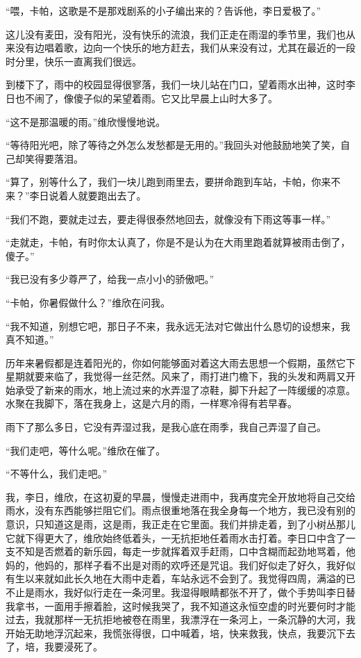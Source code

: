 \par “喂，卡帕，这歌是不是那戏剧系的小子编出来的？告诉他，李日爱极了。”
\par 这儿没有麦田，没有阳光，没有快乐的流浪，我们正走在雨湿的季节里，我们也从来没有边唱着歌，边向一个快乐的地方赶去，我们从来没有过，尤其在最近的一段时分里，快乐一直离我们很远。
\par 到楼下了，雨中的校园显得很寥落，我们一块儿站在门口，望着雨水出神，这时李日也不闹了，像傻子似的呆望着雨。它又比早晨上山时大多了。
\par “这不是那温暖的雨。”维欣慢慢地说。
\par “等待阳光吧，除了等待之外怎么发愁都是无用的。”我回头对他鼓励地笑了笑，自己却笑得要落泪。
\par “算了，别等什么了，我们一块儿跑到雨里去，要拼命跑到车站，卡帕，你来不来？”李日说着人就要跑出去了。
\par “我们不跑，要就走过去，要走得很泰然地回去，就像没有下雨这等事一样。”
\par “走就走，卡帕，有时你太认真了，你是不是认为在大雨里跑着就算被雨击倒了，傻子。”
\par “我已没有多少尊严了，给我一点小小的骄傲吧。”
\par “卡帕，你暑假做什么？”维欣在问我。
\par “我不知道，别想它吧，那日子不来，我永远无法对它做出什么恳切的设想来，我真不知道。”
\par 历年来暑假都是连着阳光的，你如何能够面对着这大雨去思想一个假期，虽然它下星期就要来临了，我觉得一丝茫然。风来了，雨打进门檐下，我的头发和两肩又开始承受了新来的雨水，地上流过来的水弄湿了凉鞋，脚下升起了一阵缓缓的凉意。水聚在我脚下，落在我身上，这是六月的雨，一样寒冷得有若早春。
\par 雨下了那么多日，它没有弄湿过我，是我心底在雨季，我自己弄湿了自己。
\par “我们走吧，等什么呢。”维欣在催了。
\par “不等什么，我们走吧。”
\par 我，李日，维欣，在这初夏的早晨，慢慢走进雨中，我再度完全开放地将自己交给雨水，没有东西能够拦阻它们。雨点很重地落在我全身每一个地方，我已没有别的意识，只知道这是雨，这是雨，我正走在它里面。我们并排走着，到了小树丛那儿它就下得更大了，维欣始终低着头，一无抗拒地任着雨水击打着。李日口中含了一支不知是否燃着的新乐园，每走一步就挥着双手赶雨，口中含糊而起劲地骂着，他妈的，他妈的，那样子看不出是对雨的欢呼还是咒诅。我们好似走了好久，我好似有生以来就如此长久地在大雨中走着，车站永远不会到了。我觉得四周，满溢的已不止是雨水，我好似行走在一条河里。我湿得眼睛都张不开了，做个手势叫李日替我拿书，一面用手擦着脸，这时候我哭了，我不知道这永恒空虚的时光要何时才能过去，我就那样一无抗拒地被卷在雨里，我漂浮在一条河上，一条沉静的大河，我开始无助地浮沉起来，我慌张得很，口中喊着，培，快来救我，快点，我要沉下去了，培，我要浸死了。
